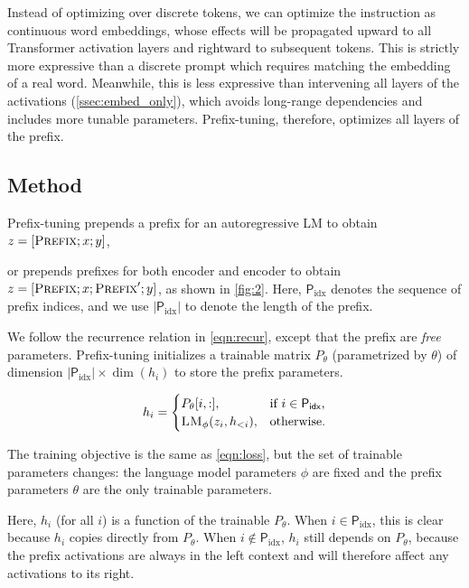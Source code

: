 Instead of optimizing over discrete tokens, we can optimize the instruction as continuous word embeddings, whose effects will be propagated upward to all Transformer activation layers and rightward to subsequent tokens. This is strictly more expressive than a discrete prompt which requires matching the embedding of a real word. Meanwhile, this is less expressive than intervening all layers of the activations (\ref{ssec:embed_only}), which avoids long-range dependencies and includes more tunable parameters. Prefix-tuning, therefore, optimizes all layers of the prefix. 

\subsection{Method}
\label{ssec:formalmethod}
Prefix-tuning prepends a prefix for an autoregressive LM to obtain $z = [\textsc{Prefix}; x; y]$,  

or prepends prefixes for both encoder and encoder to obtain $z = [\textsc{Prefix}; x; \textsc{Prefix}'; y]$, as shown in \ref{fig:2}. Here, $\textsf{P$_{\text{idx}}$}$ denotes the sequence of prefix indices, and we use $|\textsf{P$_{\text{idx}}$}|$ to denote the length of the prefix. 

We follow the recurrence relation in \ref{eqn:recur}, except that the prefix are \emph{free} parameters. Prefix-tuning initializes a trainable matrix $P_\theta$ (parametrized by $\theta$) of dimension $|\textsf{P$_{\text{idx}}$}| \times \dim(h_i)$ to store the prefix parameters.

\begin{align}
h_{i} = 
\begin{cases}
P_{\theta}[i,:],             & \text{if } i \in \textsf{P$_{\text{idx}}$} \text{,}\\
\textsc{LM}_\phi(z_i, h_{<i}),    	      & \text{otherwise.}
\end{cases}
\end{align}

The training objective is the same as \ref{eqn:loss}, but the set of trainable parameters changes: the language model parameters $\phi$ are fixed and the prefix parameters $\theta$ are the only trainable parameters. 

Here, $h_i$ (for all $i$) is a function of the trainable $P_\theta$. 
When $i \in \textsf{P$_{\text{idx}}$} $, this is clear because $h_i$ copies directly from $P_{\theta}$. 
When $i \not \in  \textsf{P$_{\text{idx}}$} $, $h_i$ still depends on $P_{\theta}$, because the prefix activations are always in the left context and will therefore affect any activations to its right. 

